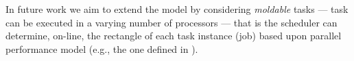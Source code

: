 \documentclass[a4paper]{article}
\begin{document}
In future work we aim to extend the model by considering \emph{moldable} tasks --- task can be executed in a varying number of processors --- that is the scheduler can determine, on-line, the rectangle of each task instance (job) based upon parallel performance model (e.g., the one defined in \cite{CCG06b}).



\end{document}
